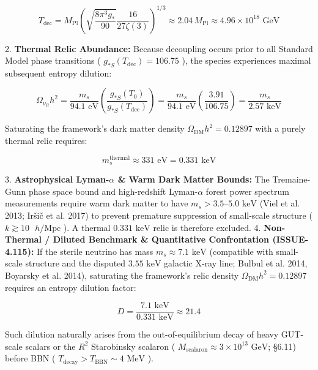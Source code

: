 \documentclass[11pt,a4paper]{article}
\theoremstyle{definition}
\theoremstyle{remark}
\begin{document}
\begin{equation}
T_{\text{dec}} = M_{\text{Pl}} \left( \sqrt{\frac{8\pi^3 g_*}{90}} \frac{16}{27\zeta(3)} \right)^{1/3} \approx 2.04 \, M_{\text{Pl}} \approx 4.96 \times 10^{18}\text{ GeV}
\end{equation}


2. \textbf{Thermal Relic Abundance:} Because decoupling occurs prior to all Standard Model phase transitions ( $g_{*S}(T_{\text{dec}}) = 106.75$ ), the species experiences maximal subsequent entropy dilution:


\begin{equation}
\Omega_{\nu_R} h^2 = \frac{m_s}{94.1\text{ eV}} \left(\frac{g_{*S}(T_0)}{g_{*S}(T_{\text{dec}})}\right) = \frac{m_s}{94.1\text{ eV}} \left(\frac{3.91}{106.75}\right) = \frac{m_s}{2.57\text{ keV}}
\end{equation}


Saturating the framework's dark matter density $\Omega_{\text{DM}} h^2 = 0.12897$ with a purely thermal relic requires:


\begin{equation}
m_s^{\text{thermal}} \approx 331\text{ eV} = 0.331\text{ keV}
\end{equation}


3. \textbf{Astrophysical Lyman-$\alpha$ \& Warm Dark Matter Bounds:} The Tremaine-Gunn phase space bound and high-redshift Lyman-$\alpha$ forest power spectrum measurements require warm dark matter to have $m_s > 3.5\text{--}5.0\text{ keV}$ (Viel et al. 2013; Ir\v{s}i\v{c} et al. 2017) to prevent premature suppression of small-scale structure ( $k \gtrsim 10\text{ }h\text{/Mpc}$ ). A thermal $0.331\text{ keV}$ relic is therefore excluded.
4. \textbf{Non-Thermal / Diluted Benchmark \& Quantitative Confrontation (ISSUE-4.115):}
If the sterile neutrino has mass $m_s \approx 7.1\text{ keV}$ (compatible with small-scale structure and the disputed $3.55\text{ keV}$ galactic X-ray line; Bulbul et al. 2014, Boyarsky et al. 2014), saturating the framework's relic density $\Omega_{\text{DM}} h^2 = 0.12897$ requires an entropy dilution factor:


\begin{equation}
D = \frac{7.1\text{ keV}}{0.331\text{ keV}} \approx 21.4
\end{equation}


Such dilution naturally arises from the out-of-equilibrium decay of heavy GUT-scale scalars or the $R^2$ Starobinsky scalaron ( $M_{\text{scalaron}} \approx 3 \times 10^{13}\text{ GeV}$; \S 6.11) before BBN ( $T_{\text{decay}} > T_{\text{BBN}} \sim 4\text{ MeV}$ ).
\end{document}
